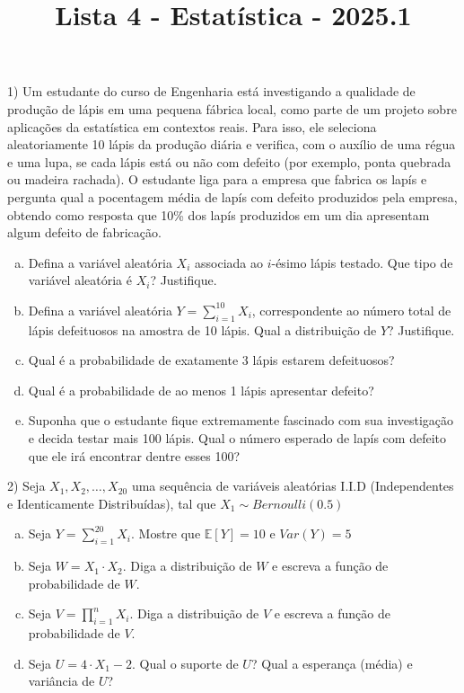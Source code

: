 \documentclass{article}
\title{Lista 4 - Estatística - 2025.1}
\begin{document}
\date{}
\maketitle

1) Um estudante do curso de Engenharia está investigando a qualidade de produção de lápis em uma pequena fábrica local, 
como parte de um projeto sobre aplicações da estatística em contextos reais. Para isso, ele seleciona aleatoriamente 10 lápis da produção diária e verifica,
 com o auxílio de uma régua e uma lupa, se cada lápis está ou não com defeito (por exemplo, ponta quebrada ou madeira rachada).
  O estudante liga para a empresa que fabrica os lapís e pergunta qual a pocentagem média de lapís com defeito produzidos pela empresa, obtendo como
   resposta que 10\% dos lapís produzidos em um dia apresentam algum defeito de fabricação.

\begin{enumerate}[a)]
    \item Defina a variável aleatória \( X_i \) associada ao \( i \)-ésimo lápis testado. Que tipo de variável aleatória é \( X_i \)? Justifique.
    
    \item Defina a variável aleatória \( Y = \sum_{i=1}^{10} X_i \), correspondente ao número total de lápis defeituosos na amostra de 10 lápis. Qual a distribuição de \( Y \)? Justifique.
    
    \item Qual é a probabilidade de exatamente 3 lápis estarem defeituosos?
    
    \item Qual é a probabilidade de ao menos 1 lápis apresentar defeito?

    \item Suponha que o estudante fique extremamente fascinado com sua investigação e decida testar mais 100 lápis.
     Qual o número esperado de lapís com defeito que ele irá encontrar dentre esses 100?
\end{enumerate}

\vspace{5px}

2) Seja $X_1, X_2, \dots, X_{20}$ uma sequência de variáveis aleatórias I.I.D (Independentes e Identicamente Distribuídas), tal que $X_1 \sim Bernoulli(0.5)$
\begin{enumerate}[a)]
    \item Seja $Y=\sum_{i=1}^{20} X_i$. Mostre que $\mathds{E}[Y] = 10$ e $Var(Y) = 5$
    \item Seja $W=X_1 \cdot X_2$. Diga a distribuição de $W$ e escreva a função de probabilidade de $W$.
    \item Seja $V = \prod_{i=1}^n X_i$. Diga a distribuição de $V$ e escreva a função de probabilidade de $V$.
    \item Seja $U = 4 \cdot X_1 - 2$. Qual o suporte de $U$? Qual a esperança (média)  e variância de $U$?
\end{enumerate} 
\end{document}
